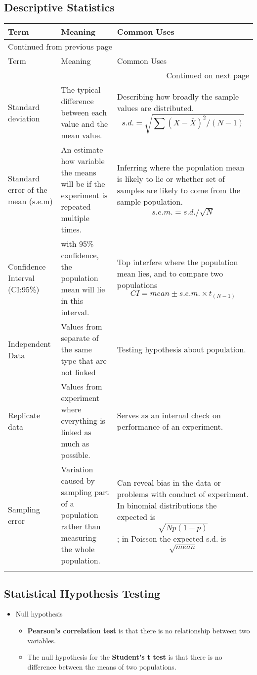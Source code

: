 \documentclass[10pt,article]{article}
\begin{document}
\subsection{Descriptive Statistics}
\label{sec:org39d5bb7}

\begin{longtable}{|p{3cm}|p{6cm}|p{6cm}|}
Term & Meaning & Common Uses\\
\hline
\endfirsthead
\multicolumn{3}{l}{Continued from previous page} \\
\hline

Term & Meaning & Common Uses \\

\hline
\endhead
\hline\multicolumn{3}{r}{Continued on next page} \\
\endfoot
\endlastfoot
\hline
Standard deviation & The typical difference between each value and the mean value. & Describing how broadly the sample values are distributed.  $$s.d.=\sqrt{\sum(X-\bar{X})^2/(N-1)}$$\\
Standard error of the mean (s.e.m) & An estimate how variable the means will be if the experiment is repeated multiple times. & Inferring where the population mean is likely to lie or whether set of samples are likely to come from the sample population.  $$s.e.m.=s.d./\sqrt{N}$$\\
Confidence Interval (CI:95\%) & with 95\% confidence, the population mean will lie in this interval. & Top interfere where the population mean lies, and to compare two populations $$CI=mean\pm s.e.m. \times t_{(N-1)}$$\\
Independent Data & Values from separate of the same type that are not linked & Testing hypothesis about population.\\
Replicate data & Values from experiment where everything is linked as much as possible. & Serves as an internal check on performance of an experiment.\\
Sampling error & Variation caused by sampling part of a population rather than measuring the whole population. & Can reveal bias in the data or problems with conduct of experiment. In binomial distributions the expected is $$\sqrt{Np(1-p)}$$; in Poisson the expected s.d. is $$\sqrt{mean}$$\\
\hline
 &  & \\
\end{longtable}

\subsection{Statistical Hypothesis Testing}
\label{sec:orge5c3d4e}
\begin{itemize}
\item Null hypothesis
\begin{itemize}
\item \textbf{Pearson’s correlation test} is that there is no {\color{green}relationship between two variables}.
\item The null hypothesis for the \textbf{Student’s t test} is that there is no {\color{green}difference between the means of two populations}.
\end{itemize}
\end{itemize}
\end{document}
